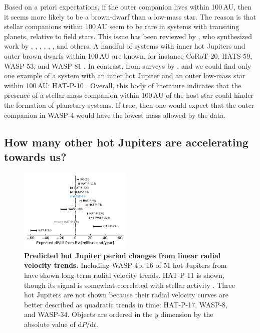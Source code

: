 \documentclass[12pt,twocolumn,tighten,trackchanges]{aastex62}
\begin{document}
Based on a priori expectations, if the outer companion lives within
100$\,$AU, then it seems more likely to be a brown-dwarf than a
low-mass star.  The reason is that stellar companions within 100$\,$AU
seem to be rare in systems with transiting planets, relative to field
stars.  This issue has been reviewed by \citet{moe_impact_2019}, who
synthesized work by \citet{wang_influence_2014,wang_influence_2015},
\citet{ngo_2015_fohj2}, \citet{ngo_friends_2016}, \citet{kraus_impact_2016},
\citet{matson_stellar_2018}, \citet{ziegler_soar_2020}, and others.
A handful of systems with inner hot Jupiters and outer brown dwarfs within
100$\,$AU are known, for instance CoRoT-20, HATS-59, WASP-53,
and WASP-81
\citep{triaud_peculiar_2017,rey_brown_2018,sarkis_hats-59bc_2018}.  In
contrast, from surveys by
\citet{knutson_friends_2014}, \citet{ngo_2015_fohj2} and
\citet{mugrauer_search_2019} we could find only one example of a
system with an inner hot Jupiter and an outer low-mass star within
100$\,$AU: HAT-P-10 \citep{bakos_2009_hatp10}.  Overall, this body of
literature indicates that the presence of a stellar-mass companion
within 100$\,$AU of the host star could hinder the formation of
planetary systems.  If true, then one would expect that the outer
companion in WASP-4 would have the lowest mass allowed by the data.


\subsection{How many other hot Jupiters are accelerating towards us?}

\begin{figure}[t]
	\begin{center}
		\leavevmode
		\includegraphics[width=0.48\textwidth]{f5.pdf}
	\end{center}
	\vspace{-0.4cm}
	\caption{
  {\bf Predicted hot Jupiter period changes from linear radial
  velocity trends.} Including WASP-4b, 16 of 51 hot Jupiters from
  \citet{knutson_friends_2014} have shown long-term radial velocity
  trends.  HAT-P-11 is shown, though its signal is somewhat correlated
  with stellar activity \citep{yee_hat-p-11_2018}.  Three hot Jupiters
  are not shown because their radial velocity curves are better
  described as quadratic trends in time: HAT-P-17, WASP-8, and
  WASP-34.  Objects are ordered in the $y$ dimension by the absolute
  value of d$P$/d$t$.
	\label{fig:pdot_pop}
  \vspace{-0.3cm}
	}
\end{figure}
\end{document}
